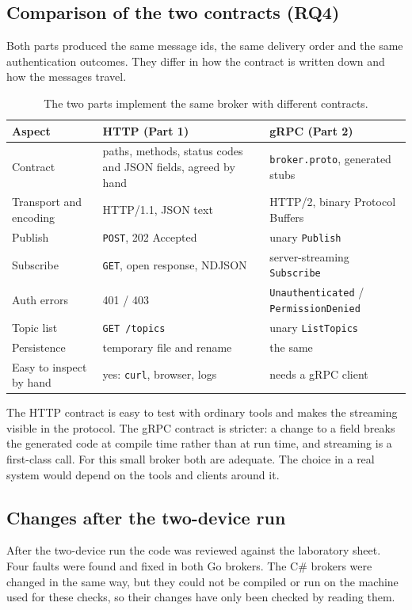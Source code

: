 \documentclass[12pt,a4paper]{article}
\begin{document}
\subsection{Comparison of the two contracts (RQ4)}
Both parts produced the same message ids, the same delivery order and the same
authentication outcomes. They differ in how the contract is written down and how
the messages travel.

\begin{table}[H]
\centering
\small
\begin{tabularx}{\textwidth}{@{}l X X@{}}
\toprule
\textbf{Aspect} & \textbf{HTTP (Part 1)} & \textbf{gRPC (Part 2)} \\
\midrule
Contract & paths, methods, status codes and JSON fields, agreed by hand & \texttt{broker.proto}, generated stubs \\
Transport and encoding & HTTP/1.1, JSON text & HTTP/2, binary Protocol Buffers \\
Publish & \texttt{POST}, 202 Accepted & unary \texttt{Publish} \\
Subscribe & \texttt{GET}, open response, NDJSON & server-streaming \texttt{Subscribe} \\
Auth errors & 401 / 403 & \texttt{Unauthenticated} / \texttt{PermissionDenied} \\
Topic list & \texttt{GET /topics} & unary \texttt{ListTopics} \\
Persistence & temporary file and rename & the same \\
Easy to inspect by hand & yes: \texttt{curl}, browser, logs & needs a gRPC client \\
\bottomrule
\end{tabularx}
\caption{The two parts implement the same broker with different contracts.}
\label{tab:comparison}
\end{table}

The HTTP contract is easy to test with ordinary tools and makes the streaming
visible in the protocol. The gRPC contract is stricter: a change to a field
breaks the generated code at compile time rather than at run time, and streaming
is a first-class call. For this small broker both are adequate. The choice in a
real system would depend on the tools and clients around it.

\subsection{Changes after the two-device run}\label{sec:changes}
After the two-device run the code was reviewed against the laboratory sheet. Four
faults were found and fixed in both Go brokers. The C\# brokers were changed in the
same way, but they could not be compiled or run on the machine used for these
checks, so their changes have only been checked by reading them.
\end{document}
